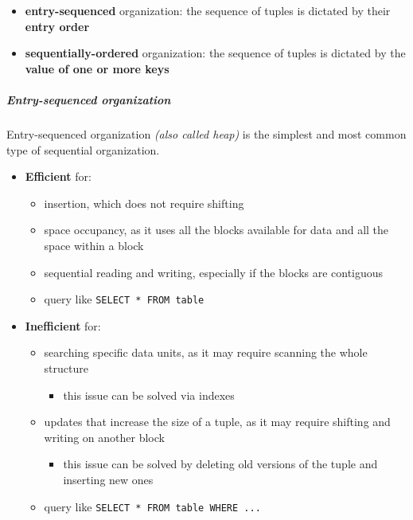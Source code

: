 \documentclass[english]{article}
\begin{document}
\begin{itemize}
  \item \textbf{entry-sequenced} organization: the sequence of tuples is dictated by their \textbf{entry order}
  \item \textbf{sequentially-ordered} organization: the sequence of tuples is dictated by the \textbf{value of one or more keys}
\end{itemize}

\subparagraph*{Entry-sequenced organization} Entry-sequenced organization \textit{(also called heap)} is the simplest and most common type of sequential organization.

\begin{itemize}
  \item \textbf{Efficient} for:
        \begin{itemize}[label=\cmarkthin]
          \item insertion, which does not require shifting
          \item space occupancy, as it uses all the blocks available for data and all the space within a block
          \item sequential reading and writing, especially if the blocks are contiguous
          \item query like \texttt{SELECT * FROM table}
        \end{itemize}
  \item \textbf{Inefficient} for:
        \begin{itemize}[label=\xmarkthin]
          \item searching specific data units, as it may require scanning the whole structure
                \begin{itemize}[label=\(\rightarrow\)]
                  \item this issue can be solved via indexes
                \end{itemize}
          \item updates that increase the size of a tuple, as it may require shifting and writing on another block
                \begin{itemize}[label=\(\rightarrow\)]
                  \item this issue can be solved by deleting old versions of the tuple and inserting new ones
                \end{itemize}
          \item query like \texttt{SELECT * FROM table WHERE ...}
        \end{itemize}
\end{itemize}
\end{document}
